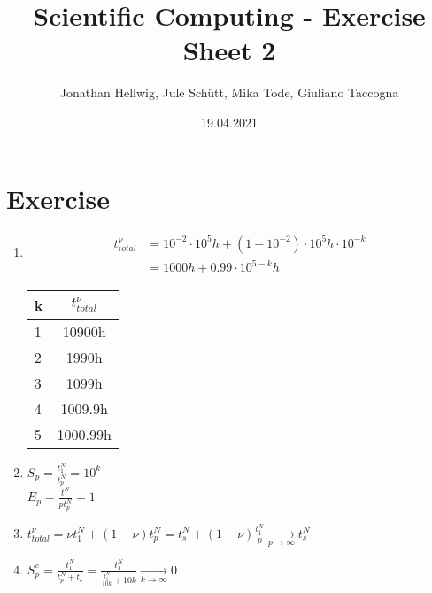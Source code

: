 \documentclass{article}
\title{Scientific Computing - Exercise Sheet 2}
\author{Jonathan Hellwig, Jule Schütt, Mika Tode, Giuliano Taccogna}
\date{19.04.2021}
\begin{document}
\maketitle

\section{Exercise}
\begin{enumerate}[label=(\alph*)]
  \item 
    \begin{align*}
      t^{\nu}_{total} &= 10^{-2} \cdot 10^5h + (1 - 10^{-2}) \cdot 10^5h\cdot 10^{-k} \\
                      &= 1000h + 0.99 \cdot 10^{5-k}h
    \end{align*}
    \begin{tabular}{ l | c } 
  k & $t^{\nu}_{total}$ \\
  \hline
  1 & 10900h \\
  2 & 1990h  \\
  3 & 1099h  \\
  4 & 1009.9h  \\
  5 & 1000.99h  \\
\end{tabular}
\item $S_p = \frac{t_1^N}{t_p^N} = 10^k$ \\
  $E_p = \frac{t_1^N}{pt_p^N} = 1$
\item $t^{\nu}_{total} = \nu t_1^N + (1-\nu)t_p^N = t_s^N + (1-\nu)\frac{t_1^N}{p} \xrightarrow[p \to \infty]{} t_s^N$
\item $S^c_p = \frac{t_1^N}{t_p^N+t_c} = \frac{t_1^N}{\frac{t_1^N}{10k} + 10k} \xrightarrow[k \to \infty]{} 0$
\end{enumerate}
\end{document}
